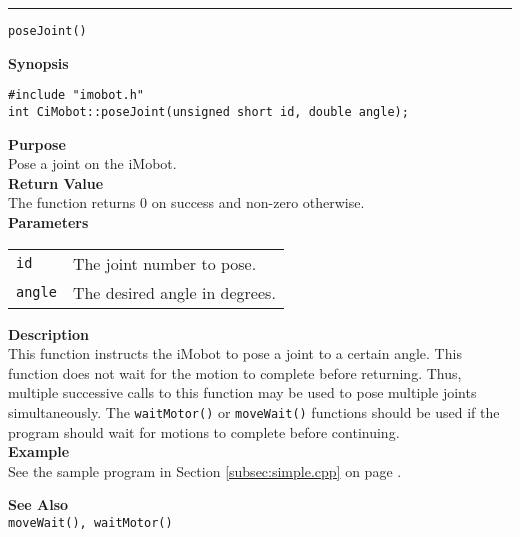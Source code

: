 \noindent
\vspace{5pt}
\rule{6.5in}{0.015in}
\noindent
{\LARGE \texttt{poseJoint()}}\\
{}

\noindent
{\bf Synopsis}\\
\begin{verbatim}
#include "imobot.h"
int CiMobot::poseJoint(unsigned short id, double angle);
\end{verbatim}

\noindent
{\bf Purpose}\\
Pose a joint on the iMobot.\\

\noindent
{\bf Return Value}\\
The function returns 0 on success and non-zero otherwise.\\

\noindent
{\bf Parameters}
\vspace{-0.1in}
\begin{description}
\item               
\begin{tabular}{p{10 mm}p{145 mm}}
\texttt{id} & The joint number to pose. \\
\texttt{angle} & The desired angle in degrees.
\end{tabular}
\end{description}

\noindent
{\bf Description}\\
This function instructs the iMobot to pose a joint to a certain angle. This
function does not wait for the motion to complete before returning. Thus,
multiple successive calls to this function may be used to pose multiple joints
simultaneously. The \texttt{waitMotor()} or \texttt{moveWait()} functions should
be used if the program should wait for motions to complete before continuing. \\

\noindent
{\bf Example}\\
See the sample program in Section \ref{subsec:simple.cpp} on page \pageref{subsec:simple.cpp}.
\noindent

\noindent
{\bf See Also}\\
\texttt{moveWait(), waitMotor()}

